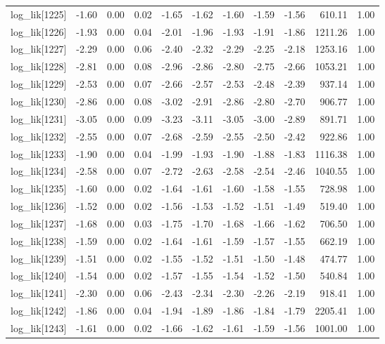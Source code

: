 \begin{table}[ht]
\begin{tabular}{rrrrrrrrrrr}
  log\_lik[1225] & -1.60 & 0.00 & 0.02 & -1.65 & -1.62 & -1.60 & -1.59 & -1.56 & 610.11 & 1.00 \\ 
  log\_lik[1226] & -1.93 & 0.00 & 0.04 & -2.01 & -1.96 & -1.93 & -1.91 & -1.86 & 1211.26 & 1.00 \\ 
  log\_lik[1227] & -2.29 & 0.00 & 0.06 & -2.40 & -2.32 & -2.29 & -2.25 & -2.18 & 1253.16 & 1.00 \\ 
  log\_lik[1228] & -2.81 & 0.00 & 0.08 & -2.96 & -2.86 & -2.80 & -2.75 & -2.66 & 1053.21 & 1.00 \\ 
  log\_lik[1229] & -2.53 & 0.00 & 0.07 & -2.66 & -2.57 & -2.53 & -2.48 & -2.39 & 937.14 & 1.00 \\ 
  log\_lik[1230] & -2.86 & 0.00 & 0.08 & -3.02 & -2.91 & -2.86 & -2.80 & -2.70 & 906.77 & 1.00 \\ 
  log\_lik[1231] & -3.05 & 0.00 & 0.09 & -3.23 & -3.11 & -3.05 & -3.00 & -2.89 & 891.71 & 1.00 \\ 
  log\_lik[1232] & -2.55 & 0.00 & 0.07 & -2.68 & -2.59 & -2.55 & -2.50 & -2.42 & 922.86 & 1.00 \\ 
  log\_lik[1233] & -1.90 & 0.00 & 0.04 & -1.99 & -1.93 & -1.90 & -1.88 & -1.83 & 1116.38 & 1.00 \\ 
  log\_lik[1234] & -2.58 & 0.00 & 0.07 & -2.72 & -2.63 & -2.58 & -2.54 & -2.46 & 1040.55 & 1.00 \\ 
  log\_lik[1235] & -1.60 & 0.00 & 0.02 & -1.64 & -1.61 & -1.60 & -1.58 & -1.55 & 728.98 & 1.00 \\ 
  log\_lik[1236] & -1.52 & 0.00 & 0.02 & -1.56 & -1.53 & -1.52 & -1.51 & -1.49 & 519.40 & 1.00 \\ 
  log\_lik[1237] & -1.68 & 0.00 & 0.03 & -1.75 & -1.70 & -1.68 & -1.66 & -1.62 & 706.50 & 1.00 \\ 
  log\_lik[1238] & -1.59 & 0.00 & 0.02 & -1.64 & -1.61 & -1.59 & -1.57 & -1.55 & 662.19 & 1.00 \\ 
  log\_lik[1239] & -1.51 & 0.00 & 0.02 & -1.55 & -1.52 & -1.51 & -1.50 & -1.48 & 474.77 & 1.00 \\ 
  log\_lik[1240] & -1.54 & 0.00 & 0.02 & -1.57 & -1.55 & -1.54 & -1.52 & -1.50 & 540.84 & 1.00 \\ 
  log\_lik[1241] & -2.30 & 0.00 & 0.06 & -2.43 & -2.34 & -2.30 & -2.26 & -2.19 & 918.41 & 1.00 \\ 
  log\_lik[1242] & -1.86 & 0.00 & 0.04 & -1.94 & -1.89 & -1.86 & -1.84 & -1.79 & 2205.41 & 1.00 \\ 
  log\_lik[1243] & -1.61 & 0.00 & 0.02 & -1.66 & -1.62 & -1.61 & -1.59 & -1.56 & 1001.00 & 1.00 \\ 

\end{tabular}
\end{table}
